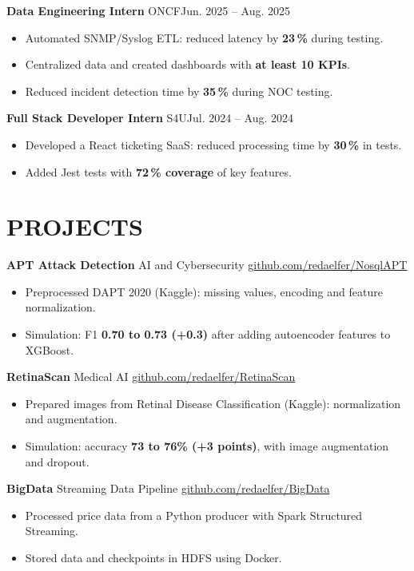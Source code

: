 \documentclass[11pt,a4paper]{article}
\newcommand{\entry}[2]{\noindent #1\hfill #2\par}
\newcommand{\jobgap}{\vspace{5pt}}
\begin{document}
\jobgap
\entry{\textbf{Data Engineering Intern} \textbar{} ONCF}{Jun. 2025 -- Aug. 2025}
\begin{itemize}
  \item Automated SNMP/Syslog ETL: reduced latency by \textbf{23\,\%} during testing.
  \item Centralized data and created dashboards with \textbf{at least 10 KPIs}.
  \item Reduced incident detection time by \textbf{35\,\%} during NOC testing.
\end{itemize}

\jobgap
\entry{\textbf{Full Stack Developer Intern} \textbar{} S4U}{Jul. 2024 -- Aug. 2024}
\begin{itemize}
  \item Developed a React ticketing SaaS: reduced processing time by \textbf{30\,\%} in tests.
  \item Added Jest tests with \textbf{72\,\% coverage} of key features.
\end{itemize}

\section*{PROJECTS}

\textbf{APT Attack Detection} \textbar{} AI and Cybersecurity \textbar{} \href{https://github.com/redaelfer/NosqlAPT}{github.com/redaelfer/NosqlAPT}\par
\begin{itemize}
  \item Preprocessed DAPT 2020 (Kaggle): missing values, encoding and feature normalization.
  \item Simulation: F1 \textbf{0.70 to 0.73 (+0.3)} after adding autoencoder features to XGBoost.
\end{itemize}

\jobgap
\textbf{RetinaScan} \textbar{} Medical AI \textbar{} \href{https://github.com/redaelfer/RetinaScan}{github.com/redaelfer/RetinaScan}\par
\begin{itemize}
  \item Prepared images from Retinal Disease Classification (Kaggle): normalization and augmentation.
  \item Simulation: accuracy \textbf{73 to 76\% (+3 points)}, with image augmentation and dropout.
\end{itemize}

\jobgap
\textbf{BigData} \textbar{} Streaming Data Pipeline \textbar{} \href{https://github.com/redaelfer/BigData}{github.com/redaelfer/BigData}\par
\begin{itemize}
  \item Processed price data from a Python producer with Spark Structured Streaming.
  \item Stored data and checkpoints in HDFS using Docker.
\end{itemize}
\end{document}
